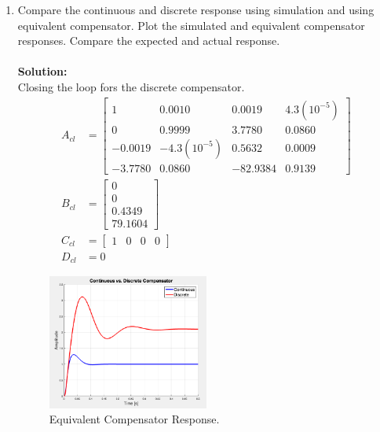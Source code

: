 \documentclass[11pt]{article}
\newcommand{\solution}{\textbf{Solution: \\}}
\begin{document}
\begin{enumerate}[label=\textbf{\arabic*.}]
  \vspace{24pt}
  \item Compare the continuous and discrete response using simulation and using 
  equivalent compensator. Plot the simulated and equivalent compensator responses. 
  Compare the expected and actual response. \\ \\ 
  \solution
  Closing the loop fors the discrete compensator.
  \begin{equation}
    \begin{split}
      A_{cl} &=
      \begin{bmatrix}
        1 & 0.0010 & 0.0019 & 4.3(10^{-5}) \\ 
        0 & 0.9999 & 3.7780 & 0.0860 \\ 
        -0.0019 & -4.3(10^{-5}) & 0.5632 & 0.0009 \\
        -3.7780 & 0.0860 & -82.9384 & 0.9139
      \end{bmatrix} \\
      B_{cl} &=
      \begin{bmatrix}
        0 \\ 0 \\ 0.4349 \\ 79.1604
      \end{bmatrix} \\
      C_{cl} &=
      \begin{bmatrix}
        1 & 0 & 0 & 0
      \end{bmatrix} \\
      D_{cl} &= 0
    \end{split}
  \end{equation}

  \begin{figure}[H]
    \centering
    \includegraphics[width=0.5\textwidth]{p6.png}
    \caption{Equivalent Compensator Response.}
  \end{figure}

\end{enumerate}
\end{document}
